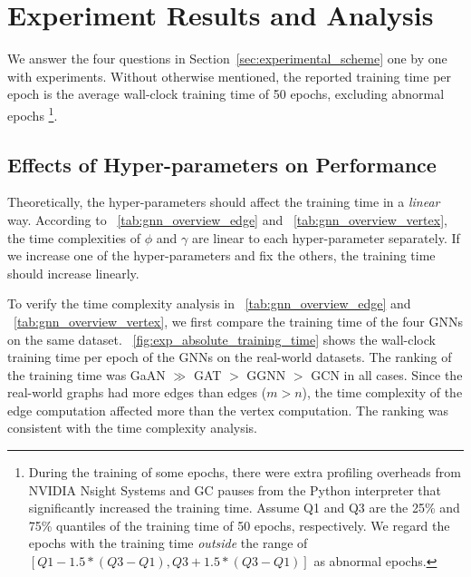 \section{Experiment Results and Analysis}
\label{sec:experiment_results}

We answer the four questions in Section~\ref{sec:experimental_scheme} one by one with experiments.
Without otherwise mentioned, the reported training time per epoch is the average wall-clock training time of 50 epochs, excluding abnormal epochs \footnote{During the training of some epochs, there were extra profiling overheads from NVIDIA Nsight Systems and GC pauses from the Python interpreter that significantly increased the training time. Assume Q1 and Q3 are the 25\% and 75\% quantiles of the training time of 50 epochs, respectively. We regard the epochs with the training time \emph{outside} the range of $[Q1 - 1.5 * (Q3-Q1), Q3 + 1.5 * (Q3-Q1)]$ as abnormal epochs.}.

\subsection{Effects of Hyper-parameters on Performance}
\label{sec:effects_of_hyper-parameters_on_performance}

Theoretically, the hyper-parameters should affect the training time in a \emph{linear} way.
According to \tablename~\ref{tab:gnn_overview_edge} and \tablename~\ref{tab:gnn_overview_vertex}, the time complexities of $\phi$ and $\gamma$ are linear to each hyper-parameter separately.
If we increase one of the hyper-parameters and fix the others, the training time should increase linearly.

To verify the time complexity analysis in \tablename~\ref{tab:gnn_overview_edge} and \tablename~\ref{tab:gnn_overview_vertex}, we first compare the training time of the four GNNs on the same dataset.
\figurename~\ref{fig:exp_absolute_training_time} shows the wall-clock training time per epoch of the GNNs on the real-world datasets.
The ranking of the training time was GaAN $\gg$ GAT $>$ GGNN $>$ GCN in all cases.
Since the real-world graphs had more edges than edges ($m > n$), the time complexity of the edge computation affected more than the vertex computation.
The ranking was consistent with the time complexity analysis.

